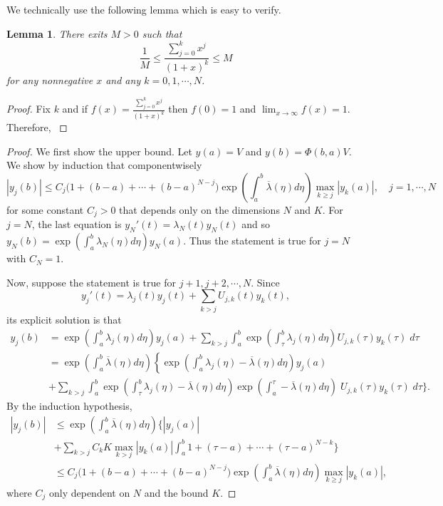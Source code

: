 \documentclass[a4paper,11pt]{article}
\def\red{\color{red}}
\newcommand{\upl}{\overline{\lambda}}
\newtheorem{lemma}{Lemma}[section]
\theoremstyle{remark}
\begin{document}
We technically use the following lemma which is easy to verify.
\begin{lemma}
There exits $M>0$ such that
$$ \frac{1}{M} \le \frac{ \displaystyle\sum_{j=0}^k x^j}{(1+x)^k} \le {M}$$
for any nonnegative $x$ and any $k=0,1, \cdots,N$.
\end{lemma}
\begin{proof}
{\red
 Fix $k$ and if $f(x) = \frac{ \displaystyle\sum_{j=0}^k x^j}{(1+x)^k}$ then $f(0)=1$ and $\lim_{x \rightarrow \infty} f(x) = 1$. Therefore, 
}
\end{proof}


\begin{proof}
 
We first show the upper bound. Let $y(a) = V$ and $y(b)= \Phi(b,a)V$.
We show by induction that componentwisely
 $$|y_j(b)| \le C_j \Big(1 + (b-a) + \cdots + (b-a)^{N-j} \Big) \exp\left(\int_a^b \upl(\eta) d\eta\right)\max_{k\ge j}|y_k(a)|, \quad j=1,\cdots,N$$
for some constant $C_j>0$ that depends only on the dimensions $N$ and $K$.
For $j=N$, the last equation is $y_N'(t) = \lambda_N(t)y_N(t)$ and so $y_N(b) = \exp\left(\int_a^b \lambda_N(\eta) d\eta\right)y_N(a)$. Thus the statement is true for $j=N$ with $C_N=1$.
 
 Now, suppose the statement is true for $j+1, j+2, \cdots, N$. Since
 $$ y_j'(t) = \lambda_j(t) y_j(t) + \sum_{k>j} U_{j,k}(t)y_k(t),$$
 its explicit solution is that
 \begin{align*}
  y_j(b) &= \exp\left(\int_a^b \lambda_j(\eta) d\eta\right)y_j(a) + \sum_{k>j} \int_a^b \exp\left(\int_\tau^b \lambda_j(\eta) d\eta\right)U_{j,k}(\tau)y_k(\tau)\; d\tau\\
  &=\exp\left(\int_a^b \upl(\eta) d\eta\right)\left\{\exp\left(\int_a^b \lambda_j(\eta)-\upl(\eta) d\eta\right)y_j(a) \right.\\
  &+ \sum_{k>j}\int_a^b \exp\left(\int_\tau^b \lambda_j(\eta)-\upl(\eta) d\eta\right)\exp\left(\int_a^\tau -\upl(\eta) d\eta\right)\; U_{j,k}(\tau)y_k(\tau)\;d\tau \bigg\}.
 \end{align*}
 By the induction hypothesis,
 \begin{align*}
  |y_j(b)| &\le \exp\left(\int_a^b \upl(\eta) d\eta\right)\bigg\{ |y_j(a)|  \\
  &+  \sum_{k>j} C_k K  \max_{k>j}|y_k(a)|\int_a^b 1+(\tau-a)+ \cdots + (\tau-a)^{N-k} \bigg\}\\
  &\le C_j\Big(1 + (b-a) + \cdots + (b-a)^{N-j} \Big) \exp\left(\int_a^b \upl(\eta) d\eta\right)\max_{k\ge j}|y_k(a)|,
 \end{align*}
 where $C_j$ only dependent on $N$ and the bound $K$.
 

\end{proof}
\end{document}

